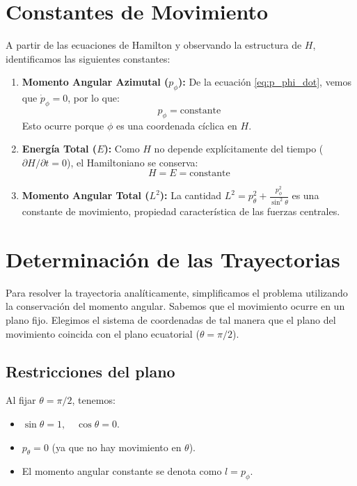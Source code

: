 \documentclass[12pt, a4paper]{article}
\begin{document}
\section*{Constantes de Movimiento}

A partir de las ecuaciones de Hamilton y observando la estructura de $H$, identificamos las siguientes constantes:

\begin{enumerate}
    \item \textbf{Momento Angular Azimutal ($p_\phi$):}
    De la ecuación \eqref{eq:p_phi_dot}, vemos que $\dot{p}_\phi = 0$, por lo que:
    \[ p_\phi = \text{constante} \]
    Esto ocurre porque $\phi$ es una coordenada cíclica en $H$.

    \item \textbf{Energía Total ($E$):}
    Como $H$ no depende explícitamente del tiempo ($\partial H / \partial t = 0$), el Hamiltoniano se conserva:
    \[ H = E = \text{constante} \]

    \item \textbf{Momento Angular Total ($L^2$):}
    La cantidad $L^2 = p_\theta^2 + \frac{p_\phi^2}{\sin^2\theta}$ es una constante de movimiento, propiedad característica de las fuerzas centrales.
\end{enumerate}

\section*{Determinación de las Trayectorias}

Para resolver la trayectoria analíticamente, simplificamos el problema utilizando la conservación del momento angular. Sabemos que el movimiento ocurre en un plano fijo. Elegimos el sistema de coordenadas de tal manera que el plano del movimiento coincida con el plano ecuatorial ($\theta = \pi/2$).

\subsection*{Restricciones del plano}
Al fijar $\theta = \pi/2$, tenemos:
\begin{itemize}
    \item $\sin\theta = 1, \quad \cos\theta = 0$.
    \item $p_\theta = 0$ (ya que no hay movimiento en $\theta$).
    \item El momento angular constante se denota como $l = p_\phi$.
\end{itemize}
\end{document}
